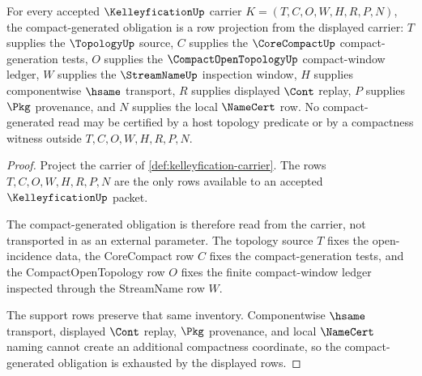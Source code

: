 \begin{theorem}
\label{thm:kelleyfication-compact-generated-obligation}
For every accepted $\KelleyficationUp$ carrier $K=(T,C,O,W,H,R,P,N)$, the compact-generated obligation is a row projection from the displayed carrier: $T$ supplies the $\TopologyUp$ source, $C$ supplies the $\CoreCompactUp$ compact-generation tests, $O$ supplies the $\CompactOpenTopologyUp$ compact-window ledger, $W$ supplies the $\StreamNameUp$ inspection window, $H$ supplies componentwise $\hsame$ transport, $R$ supplies displayed $\Cont$ replay, $P$ supplies $\Pkg$ provenance, and $N$ supplies the local $\NameCert$ row. No compact-generated read may be certified by a host topology predicate or by a compactness witness outside $T,C,O,W,H,R,P,N$.
\end{theorem}
\begin{proof}
Project the carrier of \autoref{def:kelleyfication-carrier}. The rows $T,C,O,W,H,R,P,N$ are the only rows available to an accepted $\KelleyficationUp$ packet.

The compact-generated obligation is therefore read from the carrier, not transported in as an external parameter. The topology source $T$ fixes the open-incidence data, the CoreCompact row $C$ fixes the compact-generation tests, and the CompactOpenTopology row $O$ fixes the finite compact-window ledger inspected through the StreamName row $W$.

The support rows preserve that same inventory. Componentwise $\hsame$ transport, displayed $\Cont$ replay, $\Pkg$ provenance, and local $\NameCert$ naming cannot create an additional compactness coordinate, so the compact-generated obligation is exhausted by the displayed rows.
\end{proof}


